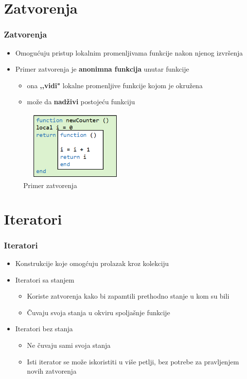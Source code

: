 \documentclass{beamer}
\begin{document}
\section{Zatvorenja}
\begin{frame}
\frametitle{Zatvorenja}
\begin{itemize}
\item Omogućuju pristup lokalnim promenljivama funkcije nakon njenog izvršenja
\item Primer zatvorenja je \textbf{anonimna funkcija} unutar funkcije
\begin{itemize}
\item ona \textbf{,,vidi"} lokalne promenljive funkcije kojom je okružena
\item može da \textbf{nadživi} postojeću funkciju
\end{itemize}
\end{itemize}

\begin{figure}
\includegraphics[scale=2.98, width=160pt, height=100pt]{zatvorenje.png}
\caption{Primer zatvorenja}
\end{figure}


\end{frame}



\section{Iteratori}
\begin{frame}
\frametitle{Iteratori}

\begin{itemize}
\item Konstrukcije koje omogćuju prolazak kroz kolekciju
\item Iteratori sa stanjem
\begin{itemize}
\item Koriste zatvorenja kako bi zapamtili prethodno stanje u kom su bili
\item Čuvaju svoja stanja u okviru spoljašnje funkcije
\end{itemize}
\item Iteratori bez stanja
\begin{itemize}
\item Ne čuvaju sami svoja stanja
\item Isti iterator se može iskoristiti u više petlji, bez potrebe za pravljenjem novih zatvorenja
\end{itemize}
\end{itemize}

\end{frame}
\end{document}
